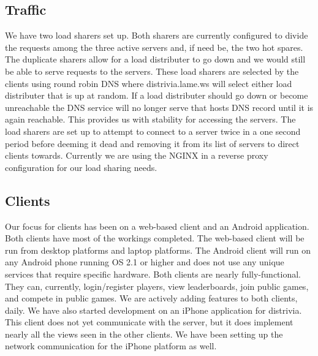 \documentclass{dependencies/acm_proc_article-sp}
\begin{document}
\subsection{Traffic}
We have two load sharers set up. Both sharers are currently configured to
divide the requests among the three active servers and, if need be, the two hot spares. The duplicate sharers allow
for a load distributer to go down and we would still be able to serve requests
to the servers. These load sharers are selected by the clients using round
robin DNS where distrivia.lame.ws will select either load distributer that is
up at random. If a load distributer should go down or become unreachable the
DNS service will no longer serve that hosts DNS record until it is again
reachable. This provides us with stability for accessing the servers. The
load sharers are set up to attempt to connect to a server twice in a one second
period before deeming it dead and removing it from its list of servers to direct clients towards.
Currently we are using the NGINX \cite{nginx} in a reverse proxy configuration
for our load sharing needs.

\subsection{Clients}
Our focus for clients has been on a web-based client and an Android application.
Both clients have most of the workings completed. The web-based client will
be run from desktop platforms and laptop platforms. The Android client will run
on any Android phone running OS 2.1 or higher and does not use any unique services that require specific
hardware. Both clients are nearly fully-functional. They can, currently, login/register
players, view leaderboards, join public games, and compete in public games. We are actively adding features to both clients, daily.
We have also started development on an iPhone application for distrivia. This client does not yet communicate with the server, but 
it does implement nearly all the views seen in the other clients. We have been setting up the network communication for the iPhone
platform as well.
\end{document}
